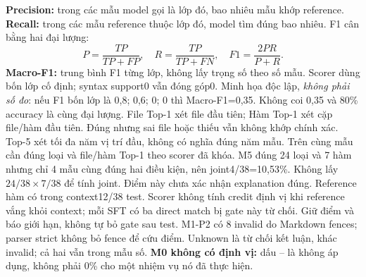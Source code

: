 \documentclass[12pt,a4paper]{article}
\begin{document}
\textbf{Precision:} trong các mẫu model gọi là lớp đó, bao nhiêu mẫu khớp reference. \textbf{Recall:} trong các mẫu reference thuộc lớp đó, model tìm đúng bao nhiêu. F1 cân bằng hai đại lượng:
\[
P=\frac{TP}{TP+FP},\quad R=\frac{TP}{TP+FN},\quad F1=\frac{2PR}{P+R}.
\]
\textbf{Macro-F1:} trung bình F1 từng lớp, không lấy trọng số theo số mẫu. Scorer dùng bốn lớp cố định; syntax support0 vẫn đóng góp0. Minh họa độc lập, \emph{không phải số đo}: nếu F1 bốn lớp là 0,8; 0,6; 0; 0 thì Macro-F1=0,35. Không coi 0,35 và 80\% accuracy là cùng đại lượng.
File Top-1 xét file đầu tiên; Hàm Top-1 xét cặp file/hàm đầu tiên. Đúng  nhưng sai file hoặc thiếu  vẫn không khớp chính xác. Top-5 xét tối đa năm vị trí đầu, không có nghĩa đúng năm mẫu.
Trên cùng mẫu cần đúng loại và file/hàm Top-1 theo scorer đã khóa. M5 đúng 24 loại và 7 hàm nhưng chỉ 4 mẫu cùng đúng hai điều kiện, nên joint4/38=10,53\%. Không lấy \(24/38\times7/38\) để tính joint. Điểm này chưa xác nhận explanation đúng.
Reference hàm có trong context12/38 test. Scorer không tính credit định vị khi reference vắng khỏi context; mỗi SFT có ba direct match bị gate này từ chối. Giữ điểm và báo giới hạn, không tự bỏ gate sau test. M1-P2 có 8 invalid do Markdown fences; parser strict không bỏ fence để cứu điểm. Unknown là từ chối kết luận, khác invalid; cả hai vẫn trong mẫu số.
\textbf{M0 không có định vị:} dấu -- là không áp dụng, không phải 0\% cho một nhiệm vụ nó đã thực hiện.

\nextpage
\end{document}
